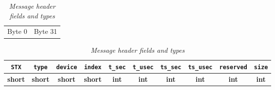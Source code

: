 \documentclass[11pt]{report}
\begin{document}
\begin{table}[ht]
\begin{center}
{\small
\begin{tabular}{lr}
Byte 0 \hspace{.4\textwidth} & \hspace{.4\textwidth} Byte 31\\
\end{tabular}
\begin{tabular}{|c|c|c|c|c|c|c|c|c|c|}
\hline
{\tt STX} & {\tt type} & {\tt device} & {\tt index} & 
{\tt t\_sec} & {\tt t\_usec} & {\tt ts\_sec} & {\tt ts\_usec} & 
{\tt reserved} & {\tt size}\\
\hline
{\bf short} & {\bf short} & {\bf short} & {\bf short} & 
{\bf int} & {\bf int} & {\bf int} & {\bf int} & {\bf int} & {\bf int} \\
\hline
\end{tabular}
}
\end{center}
\caption{{\em Message header fields and types}}
\label{table:header}
\end{table}
\end{document}
